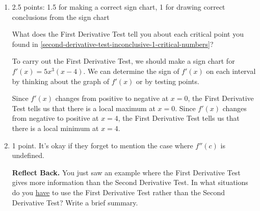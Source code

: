 \documentclass{article}
\begin{document}
\begin{enumerate}
\begin{enumerate}
  \item

    \begin{grading}
      2.5 points: 1.5 for making a correct sign chart, 1 for drawing correct conclusions from the sign chart
    \end{grading}

    \begin{problem}[\nstretch{1.25}]
      What does the First Derivative Test tell you about each critical point you found in \ref{second-derivative-test-inconclusive-1-critical-numbers}?
    \end{problem}

    \begin{solution}
      To carry out the First Derivative Test, we should make a sign chart for 
      $f'(x)=5x^3(x-4)$. We can determine the sign of $f'(x)$ on each interval
      by thinking about the graph of $f'(x)$ or by testing points.
      \begin{center}
      \end{center}
      Since $f'(x)$ changes from positive to negative at $x=0$, the First Derivative
      Test tells us that there is a local maximum at $x=0$. Since $f'(x)$ changes
      from negative to positive at $x=4$, the First Derivative Test tells us that
      there is a local minimum at $x=4$. 
    \end{solution}

  \item 

    \begin{grading}
      1 point. It's okay if they forget to mention the case where $f''(c)$ is undefined. 
    \end{grading}

    \begin{problem}[1.5in]
      \textbf{Reflect Back.} You just saw an example where the First Derivative Test gives more information than the Second Derivative Test. In what situations do you \uline{have} to use the First Derivative Test rather than the Second Derivative Test? Write a brief summary.
    \end{problem}


\end{enumerate}
\end{enumerate}
\end{document}
